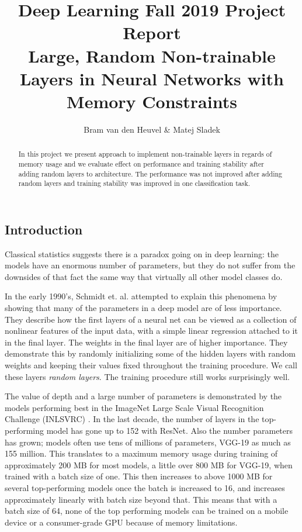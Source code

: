 \documentclass[]{article}
\title{Deep Learning Fall 2019 Project Report\\\large{Large, Random Non-trainable Layers in Neural Networks with Memory Constraints}}
\author{Bram van den Heuvel \& Matej Sladek}
\begin{document}
\maketitle

\begin{abstract}
	In this project we present approach to implement non-trainable layers in regards of memory usage and we evaluate effect on performance and training stability after adding random layers to architecture. The performance was not improved after adding random layers and training stability was improved in one classification task.
\end{abstract}


\begin{multicols}{2}
	\section{Introduction}
	Classical statistics suggests there is a paradox going on in deep learning: the models have an enormous number of parameters, but they do not suffer from the downsides of that fact the same way that virtually all other model classes do.
	
	In the early 1990's, Schmidt et. al. \cite{Schmidt_Kraaijveld_Duin} attempted to explain this phenomena by showing that many of the parameters in a deep model are of less importance. They describe how the first layers of a neural net can be viewed as a collection of nonlinear features of the input data, with a simple linear regression attached to it in the final layer. The weights in the final layer are of higher importance. They demonstrate this by randomly initializing some of the hidden layers with random weights and keeping their values fixed throughout the training procedure. We call these layers \emph{random layers}. The training procedure still works surprisingly well.
	
	The value of depth and a large number of parameters is demonstrated by the models performing best in the ImageNet Large Scale Visual Recognition Challenge (INLSVRC) \cite{DBLP:journals/corr/CanzianiPC16}. In the last decade, the number of layers in the top-performing model has gone up to 152 with ResNet. Also the number parameters has grown; models often use tens of millions of parameters, VGG-19 as much as 155 million. This translates to a maximum memory usage during training of approximately 200 MB for most models, a little over 800 MB for VGG-19, when trained with a batch size of one. This then increases to above 1000 MB for several top-performing models once the batch is increased to 16, and increases approximately linearly with batch size beyond that. This means that with a batch size of 64, none of the top performing models can be trained on a mobile device or a consumer-grade GPU because of memory limitations.
	

\end{multicols}
\end{document}

